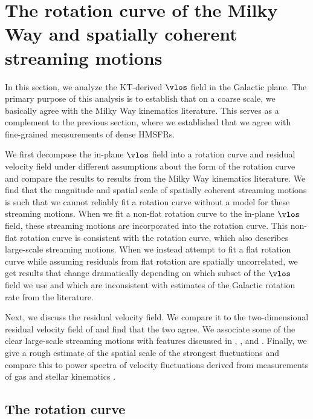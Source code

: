 \section{The rotation curve of the Milky Way and spatially coherent streaming motions}

\label{sec:rotation_curve}
In this section, we analyze the KT-derived $\vlos$ field in the Galactic plane.
The primary purpose of this analysis is to establish that on a coarse scale, we basically agree with the Milky Way kinematics literature. 
This serves as a complement to the previous section, where we established that we agree with fine-grained measurements of dense HMSFRs.

We first decompose the in-plane $\vlos$ field into a rotation curve and residual velocity field under different assumptions about the form of the rotation curve and compare the results to results from the Milky Way kinematics literature.
We find that the magnitude and spatial scale of spatially coherent streaming motions is such that we cannot reliably fit a rotation curve without a model for these streaming motions.
When we fit a non-flat rotation curve to the in-plane $\vlos$ field, these streaming motions are incorporated into the rotation curve.
This non-flat rotation curve is consistent with the \citet{Clemens} rotation curve, which also describes large-scale streaming motions.
When we instead attempt to fit a flat rotation curve while assuming residuals from flat rotation are spatially uncorrelated, we get results that change dramatically depending on which subset of the $\vlos$ field we use and which are inconsistent with estimates of the Galactic rotation rate from the literature.

Next, we discuss the residual velocity field.
We compare it to the two-dimensional residual velocity field of \citet{BrandBlitz} and find that the two agree.
We associate some of the clear large-scale streaming motions with features discussed in \citet{Clemens}, \citet{McClureGriffithsEarly}, and \citet{McClureGriffithsLate}. 
Finally, we give a rough estimate of the spatial scale of the strongest fluctuations and compare this to power spectra of velocity fluctuations derived from measurements of gas \citep{Clemens,McClureGriffithsLate} and stellar kinematics \citep{Bovy2015}. 

\subsection{The rotation curve}
\label{sec:rotation_fit}

